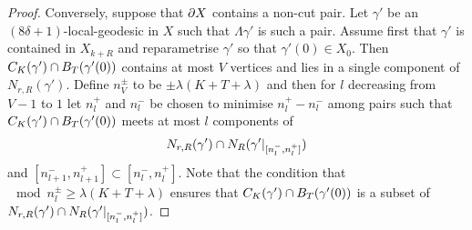 \begin{proof}
  Conversely, suppose that $\partial X$ contains a non-cut pair. 
  Let $\gamma'$ be an $(8\delta+1)$-local-geodesic in $X$ such that $\Lambda\gamma'$ is such a pair. 
  Assume first that $\gamma'$ is contained in $X_{k+R}$ and reparametrise $\gamma'$ so that $\gamma'(0) \in X_0$. 
  Then $C_K(\gamma') \cap B_{T}(\gamma'(0))$ contains at most $V$ vertices and lies in a single component of $N_{r, R}(\gamma')$. 
  Define $n_V^\pm$ to be $\pm\lambda(K+T+\lambda)$ and then for $l$ decreasing from $V-1$ to $1$ let $n_l^+$ and $n_l^-$ be chosen to minimise $n_l^+ - n_l^-$ among pairs such that $C_K(\gamma') \cap B_{T}(\gamma'(0))$ meets at most $l$ components of 
  \begin{align}
    N_{r, R}(\gamma') \cap N_R(\gamma'\vert_{[n_l^-, n_l^+]})
  \end{align}
  and $[n_{l+1}^-, n_{l+1}^+] \subset [n_l^-, n_l^+]$.  
  Note that the condition that $\mod{n^\pm_l} \geq \lambda(K + T + \lambda)$ ensures that $C_K(\gamma') \cap B_{T}(\gamma'(0))$ is a subset of $N_{r, R}(\gamma') \cap N_R(\gamma'\vert_{[n_l^-, n_l^+]})$.


\end{proof}
